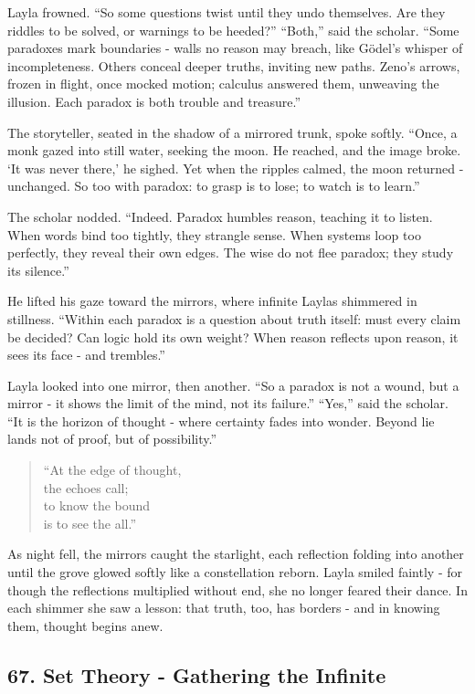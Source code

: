 \documentclass[
  letterpaper,
  DIV=11,
  numbers=noendperiod]{scrreprt}
\begin{document}
Layla frowned. ``So some questions twist until they undo themselves. Are
they riddles to be solved, or warnings to be heeded?'' ``Both,'' said
the scholar. ``Some paradoxes mark boundaries - walls no reason may
breach, like Gödel's whisper of incompleteness. Others conceal deeper
truths, inviting new paths. Zeno's arrows, frozen in flight, once mocked
motion; calculus answered them, unweaving the illusion. Each paradox is
both trouble and treasure.''

The storyteller, seated in the shadow of a mirrored trunk, spoke softly.
``Once, a monk gazed into still water, seeking the moon. He reached, and
the image broke. `It was never there,' he sighed. Yet when the ripples
calmed, the moon returned - unchanged. So too with paradox: to grasp is
to lose; to watch is to learn.''

The scholar nodded. ``Indeed. Paradox humbles reason, teaching it to
listen. When words bind too tightly, they strangle sense. When systems
loop too perfectly, they reveal their own edges. The wise do not flee
paradox; they study its silence.''

He lifted his gaze toward the mirrors, where infinite Laylas shimmered
in stillness. ``Within each paradox is a question about truth itself:
must every claim be decided? Can logic hold its own weight? When reason
reflects upon reason, it sees its face - and trembles.''

Layla looked into one mirror, then another. ``So a paradox is not a
wound, but a mirror - it shows the limit of the mind, not its failure.''
``Yes,'' said the scholar. ``It is the horizon of thought - where
certainty fades into wonder. Beyond lie lands not of proof, but of
possibility.''

\begin{quote}
``At the edge of thought,\\
the echoes call;\\
to know the bound\\
is to see the all.''
\end{quote}

As night fell, the mirrors caught the starlight, each reflection folding
into another until the grove glowed softly like a constellation reborn.
Layla smiled faintly - for though the reflections multiplied without
end, she no longer feared their dance. In each shimmer she saw a lesson:
that truth, too, has borders - and in knowing them, thought begins anew.

\subsection{67. Set Theory - Gathering the
Infinite}\label{set-theory---gathering-the-infinite}
\end{document}
